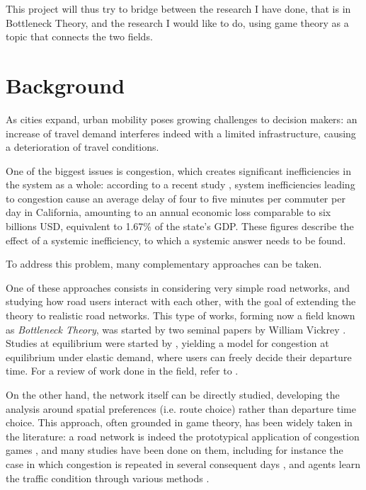 \documentclass{article}
\begin{document}
This project will thus try to bridge between the research I have done,
that is in Bottleneck Theory, and the research I would like to do,
using game theory as a topic that connects the two fields.

\section{Background}
\label{sec:background}

As cities expand,
urban mobility poses growing challenges to decision makers:
an increase of travel demand interferes indeed with a limited infrastructure,
causing a deterioration of travel conditions.

One of the biggest issues is congestion,
which creates significant inefficiencies in the system as a whole:
according to a recent study \parencite{kim2022congestion},
system inefficiencies leading to congestion
cause an average delay of four to five minutes per commuter per day in California,
amounting to an annual economic loss comparable to six billions USD,
equivalent to 1.67\% of the state's GDP.
These figures describe the effect of a systemic inefficiency,
to which a systemic answer needs to be found.

To address this problem, many complementary approaches can be taken.

One of these approaches consists in considering very simple road networks,
and studying how road users interact with each other,
with the goal of extending the theory to realistic road networks.
This type of works, forming now a field known as \textit{Bottleneck Theory},
was started by two seminal papers by William Vickrey \parencite{Vickrey1963, Vickrey1969}.
Studies at equilibrium were started by
\textcite{de1983stochastic, d0907f84-e14a-3d98-ad20-759f41491d6e},
yielding a model for congestion at equilibrium under elastic demand,
where users can freely decide their departure time.
For a review of work done in the field, refer to \textcite{LI2020311}.

On the other hand, the network itself can be directly studied,
developing the analysis around spatial preferences (i.e. route choice)
rather than departure time choice.
This approach, often grounded in game theory,
has been widely taken in the literature:
a road network is indeed the prototypical application of congestion games \parencite{Rosenthal1973ACO},
and many studies have been done on them,
including for instance the case in which congestion is repeated in several consequent days \parencite{chen1997boundedly},
and agents learn the traffic condition through various methods \parencite{han2006interactive}.
\end{document}

